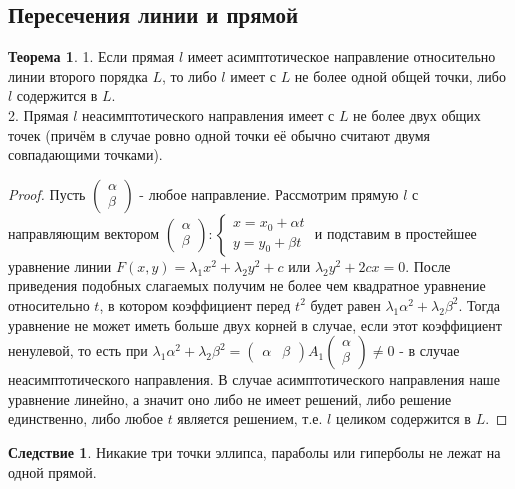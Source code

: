 \documentclass[a4paper, 12pt]{article}
\theoremstyle{definition}
\newtheorem*{theorem}{Теорема}
\newtheorem*{consequense}{Следствие}
\begin{document}
	\subsection{Пересечения линии и прямой}
	\begin{theorem}
		1. Если прямая $l$ имеет асимптотическое направление относительно линии второго порядка $L$, то либо $l$ имеет с $L$ не более одной общей точки, либо $l$ содержится в $L$.\\
		2. Прямая $l$ неасимптотического направления имеет с $L$ не более двух общих точек (причём в случае ровно одной точки её обычно считают двумя совпадающими точками).
	\end{theorem}
	\begin{proof}
		Пусть $\begin{pmatrix} \alpha \\ \beta \end{pmatrix}$ - любое направление. Рассмотрим прямую $l$ с направляющим вектором $\begin{pmatrix} \alpha \\ \beta \end{pmatrix}: \begin{cases}
		x = x_0 + \alpha t\\
		y = y_0 + \beta t
		\end{cases}$
		и подставим в простейшее уравнение линии $F(x, y) = \lambda_1x^2 + \lambda_2y^2 + c$ или $\lambda_2y^2 + 2cx = 0$. После приведения подобных слагаемых получим не более чем квадратное уравнение относительно $t$, в котором коэффициент перед $t^2$ будет равен $\lambda_1\alpha^2 + \lambda_2\beta^2$. Тогда уравнение не может иметь больше двух корней в случае, если этот коэффициент ненулевой, то есть при $\lambda_1\alpha^2 + \lambda_2\beta^2 = \begin{pmatrix} \alpha & \beta \end{pmatrix}A_1\begin{pmatrix} \alpha \\ \beta \end{pmatrix} \neq 0$ - в случае неасимптотического направления. В случае асимптотического направления наше уравнение линейно, а значит оно либо не имеет решений, либо решение единственно, либо любое $t$ является решением, т.е. $l$ целиком содержится в $L$.
 	\end{proof}
	\begin{consequense}
		Никакие три точки эллипса, параболы или гиперболы не лежат на одной прямой.
	\end{consequense}
\end{document}
